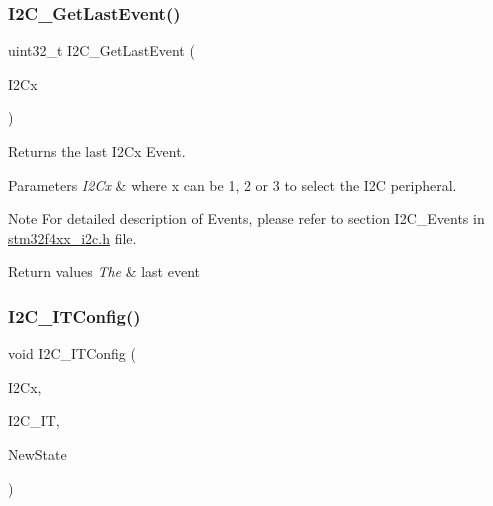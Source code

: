 \subsubsection{\texorpdfstring{I2\+C\+\_\+\+Get\+Last\+Event()}{I2C\_GetLastEvent()}}
{\footnotesize\ttfamily uint32\+\_\+t I2\+C\+\_\+\+Get\+Last\+Event (\begin{DoxyParamCaption}\item[{I2\+C\+\_\+\+Type\+Def $\ast$}]{I2\+Cx }\end{DoxyParamCaption})}



Returns the last I2\+Cx Event. 


\begin{DoxyParams}{Parameters}
{\em I2\+Cx} & where x can be 1, 2 or 3 to select the I2C peripheral.\\
\hline
\end{DoxyParams}
\begin{DoxyNote}{Note}
For detailed description of Events, please refer to section I2\+C\+\_\+\+Events in \mbox{\hyperlink{stm32f4xx__i2c_8h}{stm32f4xx\+\_\+i2c.\+h}} file.
\end{DoxyNote}

\begin{DoxyRetVals}{Return values}
{\em The} & last event \\
\hline
\end{DoxyRetVals}
\mbox{\label{group___i2_c___group5_ga58fed146a06cb81d2940604e460de047}} 
\subsubsection{\texorpdfstring{I2\+C\+\_\+\+I\+T\+Config()}{I2C\_ITConfig()}}
{\footnotesize\ttfamily void I2\+C\+\_\+\+I\+T\+Config (\begin{DoxyParamCaption}\item[{I2\+C\+\_\+\+Type\+Def $\ast$}]{I2\+Cx,  }\item[{uint16\+\_\+t}]{I2\+C\+\_\+\+IT,  }\item[{Functional\+State}]{New\+State }\end{DoxyParamCaption})}



